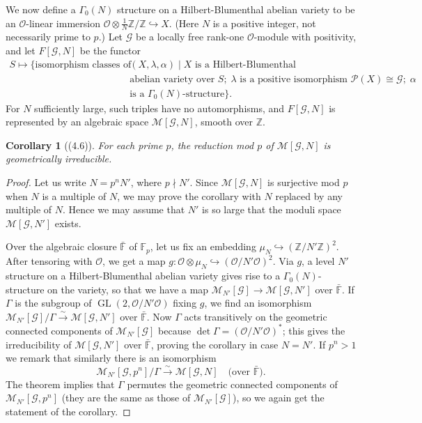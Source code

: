 \documentclass[12pt,a4paper]{article}
\theoremstyle{plain}
\newtheorem{corollary}[theorem]{Corollary}
\theoremstyle{definition}
\DeclareMathOperator{\GL}{GL}
\newcommand{\OO}{\mathcal{O}}
\newcommand{\Z}{\mathbb{Z}}
\newcommand{\F}{\mathbb{F}}
\begin{document}
We now define a $\Gamma_0(N)$ structure on a Hilbert-Blumenthal abelian variety to be an $\OO$-linear immersion $\OO\otimes\frac{1}{N}\Z/\Z\hookrightarrow X$. (Here $N$ is a positive integer, not necessarily prime to $p$.) Let $\mathscr{G}$ be a locally free rank-one $\OO$-module with positivity, and let $F[\mathscr{G},N]$ be the functor
\begin{align*}
S\mapsto\{\text{isomorphism classes of triples }&(X,\lambda,\alpha)\mid X\text{ is a Hilbert-Blumenthal}\\
&\text{abelian variety over }S;\;\lambda\text{ is a positive isomorphism }\mathscr{P}(X)\cong\mathscr{G};\;\alpha\\
&\text{is a }\Gamma_0(N)\text{-structure}\}.
\end{align*}
For $N$ sufficiently large, such triples have no automorphisms, and $F[\mathscr{G},N]$ is represented by an algebraic space $\mathscr{M}[\mathscr{G},N]$, smooth over $\Z$.

\begin{corollary}[(4.6)]\label{cor:irreducible}
For each prime $p$, the reduction mod $p$ of $\mathscr{M}[\mathscr{G},N]$ is geometrically irreducible.
\end{corollary}

\begin{proof}
Let us write $N=p^nN'$, where $p\nmid N'$. Since $\mathscr{M}[\mathscr{G},N]$ is surjective mod $p$ when $N$ is a multiple of $N$, we may prove the corollary with $N$ replaced by any multiple of $N$. Hence we may assume that $N'$ is so large that the moduli space $\mathscr{M}[\mathscr{G},N']$ exists.

Over the algebraic closure $\bar{\F}$ of $\F_p$, let us fix an embedding $\mu_N\hookrightarrow(\Z/N'\Z)^2$. After tensoring with $\OO$, we get a map $g:\OO\otimes\mu_N\hookrightarrow(\OO/N'\OO)^2$. Via $g$, a level $N'$ structure on a Hilbert-Blumenthal abelian variety gives rise to a $\Gamma_0(N)$-structure on the variety, so that we have a map $\mathscr{M}_{N'}[\mathscr{G}]\to\mathscr{M}[\mathscr{G},N']$ over $\bar{\F}$. If $\Gamma$ is the subgroup of $\GL(2,\OO/N'\OO)$ fixing $g$, we find an isomorphism $\mathscr{M}_{N'}[\mathscr{G}]/\Gamma\xrightarrow{\sim}\mathscr{M}[\mathscr{G},N']$ over $\bar{\F}$. Now $\Gamma$ acts transitively on the geometric connected components of $\mathscr{M}_{N'}[\mathscr{G}]$ because $\det\Gamma=(\OO/N'\OO)^*$; this gives the irreducibility of $\mathscr{M}[\mathscr{G},N']$ over $\bar{\F}$, proving the corollary in case $N=N'$. If $p^n>1$ we remark that similarly there is an isomorphism
\[
\mathscr{M}_{N'}[\mathscr{G},p^n]/\Gamma\xrightarrow{\sim}\mathscr{M}[\mathscr{G},N]\quad\text{(over $\bar{\F}$).}
\]
The theorem implies that $\Gamma$ permutes the geometric connected components of $\mathscr{M}_{N'}[\mathscr{G},p^n]$ (they are the same as those of $\mathscr{M}_{N'}[\mathscr{G}]$), so we again get the statement of the corollary.
\end{proof}
\end{document}
